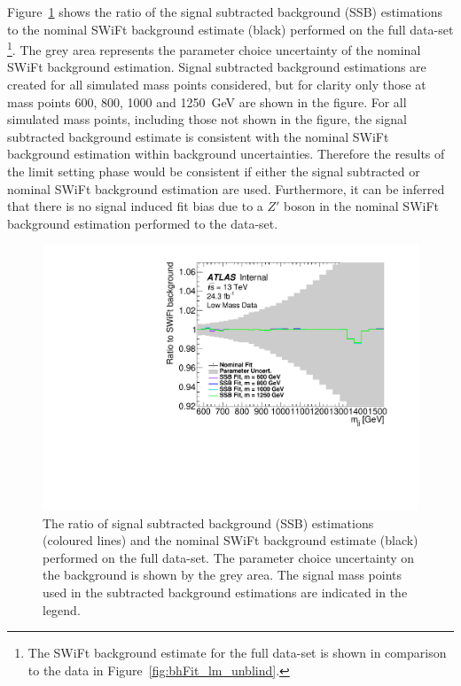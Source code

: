 Figure~\ref{fig:lim-lowmass_ssb_data} shows the ratio of the 
signal subtracted background (SSB) estimations to the nominal SWiFt background estimate (black) performed on the full \lm{} data-set
\footnote{The SWiFt background estimate for the full data-set is shown in comparison to the data in Figure~\ref{fig:bhFit_lm_unblind}.}.
The grey area represents the parameter choice uncertainty of the nominal SWiFt background estimation.
Signal subtracted background estimations are created for all simulated mass points considered,
but for clarity only those at mass points 600, 800, 1000 and 1250~GeV are shown in the figure.
For all simulated mass points, including those not shown in the figure,
the signal subtracted background estimate is consistent with the nominal SWiFt background estimation
within background uncertainties.
Therefore the results of the limit setting phase would be consistent if either the
signal subtracted or nominal SWiFt background estimation are used.
Furthermore, it can be inferred that there is no signal induced fit bias due to a $Z'$ boson
in the nominal SWiFt background estimation performed to the \lm{} data-set.

\begin{figure}[!ht]
  \begin{center}
    \includegraphics[width=0.6\linewidth, angle=0]{figs/Dibjet/LowMass/lim-ssb_data.pdf}
  \end{center}
  \vspace{-1mm}
  \caption[The ratio of signal subtracted background estimations
    and the SWiFt background estimate performed on the full \lm{} data-set.]
          {The ratio of signal subtracted background (SSB) estimations (coloured lines)
    and the nominal SWiFt background estimate (black) performed on the full \lm{} data-set.
    The parameter choice uncertainty on the background is shown by the grey area.
    The signal mass points used in the subtracted background estimations are indicated in the legend.}
  \label{fig:lim-lowmass_ssb_data}
\end{figure}

